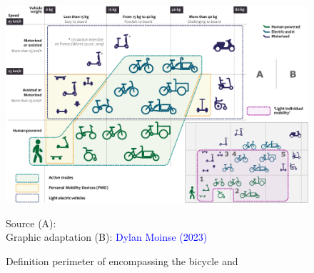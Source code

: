 \begin{refsegment}
\begin{figure}[h!]\vspace*{4pt}
    \caption{Definition perimeter of  encompassing the bicycle and }
    \label{fig-chap1:perimetre-micromobilite}
    \centerline{\includegraphics[width=1\columnwidth]{src/Figures/Chap-1/EN_Definition_perimetre_micromobilite.pdf}}
    \vspace{5pt}
    \begin{flushright}\scriptsize{
    Source (A): \textcolor{blue}{\textcite[61]{rabaud_quand_2022}}
    \\
    Graphic adaptation (B): \textcolor{blue}{Dylan Moinse (2023)}
    }\end{flushright}
\end{figure}


\end{refsegment}
